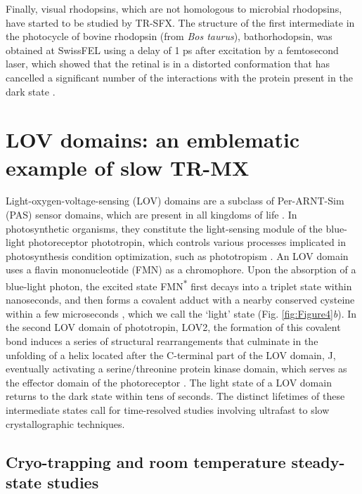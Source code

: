 Finally, visual rhodopsins, which are not homologous to microbial rhodopsins, have started to be studied by TR-SFX. The structure of the first intermediate in the photocycle of bovine rhodopsin (from \textit{Bos taurus}), bathorhodopsin, was obtained at SwissFEL using a delay of 1 ps after excitation by a femtosecond laser, which showed that the retinal is in a distorted conformation that has cancelled a significant number of the interactions with the protein present in the dark state \parencite{gruhlUltrafastStructuralChanges2023}.

\section{LOV domains: an emblematic example of slow TR-MX}\label{sec:LOV2}

Light-oxygen-voltage-sensing (LOV) domains are a subclass of Per-ARNT-Sim (PAS) sensor domains, which are present in all kingdoms of life \parencite{taylorPASDomainsInternal1999}. In photosynthetic organisms, they constitute the light-sensing module of the blue-light photoreceptor phototropin, which controls various processes implicated in photosynthesis condition optimization, such as phototropism \parencite{christiePhototropinBlueLightReceptors2007}. An LOV domain uses a flavin mononucleotide (FMN) as a chromophore. Upon the absorption of a blue-light photon, the excited state FMN\textsuperscript{\(\ast\)} first decays into a triplet state within nanoseconds, and then forms a covalent adduct with a nearby conserved cysteine within a few microseconds \parencite{swartzPhotocycleFlavinbindingDomain2001}, which we call the ‘light’ state (Fig. \ref{fig:Figure4}\textit{b}). In the second LOV domain of phototropin, LOV2, the formation of this covalent bond induces a series of structural rearrangements that culminate in the unfolding of a helix located after the C-terminal part of the LOV domain, J\textalpha , eventually activating a serine/threonine protein kinase domain, which serves as the effector domain of the photoreceptor \parencite{harperStructuralBasisPhototropin2003}. The light state of a LOV domain returns to the dark state within tens of seconds. The distinct lifetimes of these intermediate states call for time-resolved studies involving ultrafast to slow crystallographic techniques.

\subsection{Cryo-trapping and room temperature steady-state studies}

